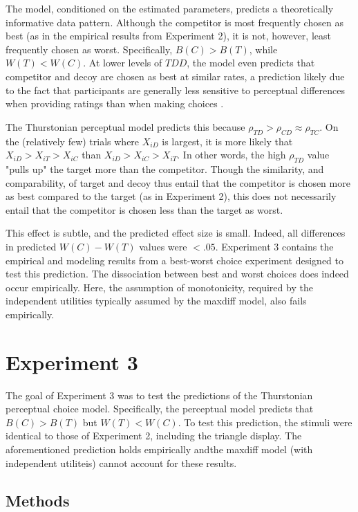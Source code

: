 The model, conditioned on the estimated parameters, predicts a theoretically informative data pattern. Although the competitor is most frequently chosen as best (as in the empirical results from Experiment 2), it is not, however, least frequently chosen as worst. Specifically, $B(C)>B(T)$, while $W(T)<W(C)$. At lower levels of $TDD$, the model even predicts that competitor and decoy are chosen as best at similar rates, a prediction likely due to the fact that participants are generally less sensitive to perceptual differences when providing ratings than when making choices \parencite{gronau2023choice}.

The Thurstonian perceptual model predicts this because $\rho_{TD}>\rho_{CD}\approx\rho_{TC}$. On the (relatively few) trials where $X_{iD}$ is largest, it is more likely that $X_{iD}>X_{iT}>X_{iC}$ than $X_{iD}>X_{iC}>X_{iT}$. In other words, the high $\rho_{TD}$ value "pulls up" the target more than the competitor. Though the similarity, and comparability, of target and decoy thus entail that the competitor is chosen more as best compared to the target  (as in Experiment 2), this does not necessarily entail that the competitor is chosen less than the target as worst.

This effect is subtle, and the predicted effect size is small. Indeed, all differences in predicted $W(C)-W(T)$ values were $<.05$. Experiment 3 contains the empirical and modeling results from a best-worst choice experiment designed to test this prediction. The dissociation between best and worst choices does indeed occur empirically. Here, the assumption of monotonicity, required by the independent utilities typically assumed by the maxdiff model, also fails empirically.

\section{Experiment 3}

The goal of Experiment 3 was to test the predictions of the Thurstonian perceptual choice model. Specifically, the perceptual model predicts that $B(C)>B(T)$ but $W(T)<W(C)$. To test this prediction, the stimuli were identical to those of Experiment 2, including the triangle display. The aforementioned prediction holds empirically andthe maxdiff model (with independent utiliteis) cannot account for these results.

\subsection{Methods}

